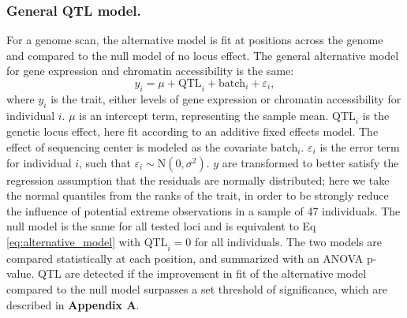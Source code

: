 \documentclass[9pt,twocolumn,twoside]{gsajnl}
\begin{document}
\subsubsection{General QTL model.}
For a genome scan, the alternative model is fit at positions across the genome and compared to the null model of no locus effect. The general alternative model for gene expression and chromatin accessibility is the same: 
\begin{equation}
y_{i} = \mu + \text{QTL}_{i} + \text{batch}_{i} + \varepsilon_{i},
\label{eq:alternative_model}
\end{equation}
where $y_{i}$ is the trait, either levels of gene expression or chromatin accessibility for individual $i$. $\mu$ is an intercept term, representing the sample mean. $\text{QTL}_{i}$ is the genetic locus effect, here fit according to an additive fixed effects model. The effect of sequencing center is modeled as the covariate $\text{batch}_{i}$. $\varepsilon_{i}$ is the error term for individual $i$, such that $\varepsilon_{i} \sim \text{N}(0, \sigma^{2})$. $y$ are transformed to better satisfy the regression assumption that the residuals are normally distributed; here we take the normal quantiles from the ranks of the trait, in order to be strongly reduce the influence of potential extreme observations in a sample of 47 individuals. The null model is the same for all tested loci and is equivalent to Eq \ref{eq:alternative_model} with $\text{QTL}_{i} = 0$ for all individuals. The two models are compared statistically at each position, and summarized with an ANOVA p-value. QTL are detected if the improvement in fit of the alternative model compared to the null model surpasses a set threshold of significance, which are described in \textbf{Appendix A}.
\end{document}

